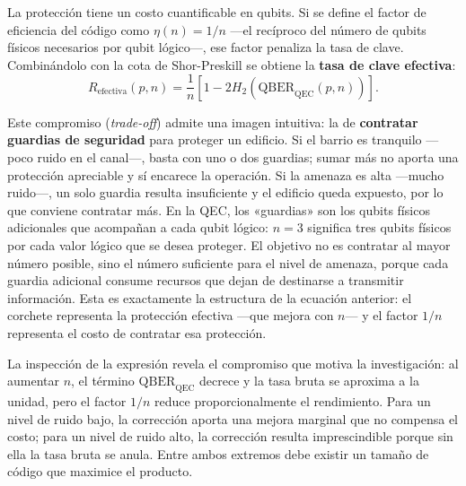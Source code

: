 \documentclass[12pt]{report}
\begin{document}
La protección tiene un costo cuantificable en qubits. Si se define el factor de
eficiencia del código como $\eta(n) = 1/n$ —el recíproco del número de qubits
físicos necesarios por qubit lógico—, ese factor penaliza la tasa de clave.
Combinándolo con la cota de Shor-Preskill se obtiene la \textbf{tasa de clave
efectiva}:
\begin{equation}
R_{\text{efectiva}}(p,n)
= \frac{1}{n}\left[1 - 2H_2\left(\mathrm{QBER}_{\text{QEC}}(p,n)\right)\right].
\label{eq:efectiva}
\end{equation}

Este compromiso (\textit{trade-off}) admite una imagen intuitiva: la de
\textbf{contratar guardias de seguridad} para proteger un edificio. Si el barrio
es tranquilo —poco ruido en el canal—, basta con uno o dos guardias; sumar más no
aporta una protección apreciable y sí encarece la operación. Si la amenaza es
alta —mucho ruido—, un solo guardia resulta insuficiente y el edificio queda
expuesto, por lo que conviene contratar más. En la QEC, los «guardias» son los
qubits físicos adicionales que acompañan a cada qubit lógico: $n = 3$ significa
tres qubits físicos por cada valor lógico que se desea proteger. El objetivo no
es contratar al mayor número posible, sino el número suficiente para el nivel de
amenaza, porque cada guardia adicional consume recursos que dejan de destinarse
a transmitir información. Esta es exactamente la estructura de la ecuación
anterior: el corchete representa la protección efectiva —que mejora con $n$— y el
factor $1/n$ representa el costo de contratar esa protección.

La inspección de la expresión revela el compromiso que motiva la investigación:
al aumentar $n$, el término $\mathrm{QBER}_{\text{QEC}}$ decrece y la tasa bruta
se aproxima a la unidad, pero el factor $1/n$ reduce proporcionalmente el
rendimiento. Para un nivel de ruido bajo, la corrección aporta una mejora
marginal que no compensa el costo; para un nivel de ruido alto, la corrección
resulta imprescindible porque sin ella la tasa bruta se anula. Entre ambos
extremos debe existir un tamaño de código que maximice el producto.
\end{document}

